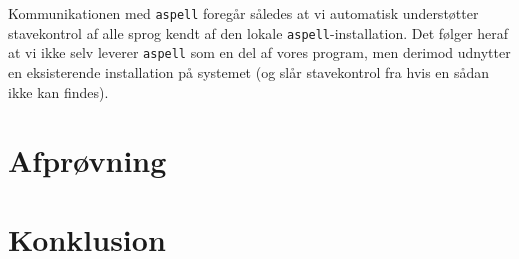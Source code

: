 \documentclass[a4paper,oneside,article]{memoir}
\begin{document}
Kommunikationen med \texttt{aspell} foregår således at
vi automatisk understøtter stavekontrol af alle sprog kendt af den
lokale \texttt{aspell}-installation. Det følger heraf at vi ikke selv
leverer \texttt{aspell} som en del af vores program, men derimod
udnytter en eksisterende installation på systemet (og slår
stavekontrol fra hvis en sådan ikke kan findes).


\chapter{Afprøvning}


\chapter{Konklusion}
\end{document}
